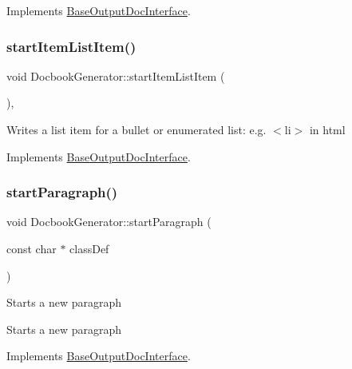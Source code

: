 Implements \mbox{\hyperlink{class_base_output_doc_interface_a54b169393594b6cf113977ccccaeb9ee}{Base\+Output\+Doc\+Interface}}.

\mbox{\label{class_docbook_generator_a2ee84d2ec43dc1634a71ee3101eab3e4}} 
\subsubsection{\texorpdfstring{startItemListItem()}{startItemListItem()}}
{\footnotesize\ttfamily void Docbook\+Generator\+::start\+Item\+List\+Item (\begin{DoxyParamCaption}{ }\end{DoxyParamCaption})\hspace{0.3cm}{\ttfamily [inline]}, {\ttfamily [virtual]}}

Writes a list item for a bullet or enumerated list\+: e.\+g. {\ttfamily $<$li$>$} in html 

Implements \mbox{\hyperlink{class_base_output_doc_interface_aa1cbcadfedf8e6d52029d17526b5fa3f}{Base\+Output\+Doc\+Interface}}.

\mbox{\label{class_docbook_generator_aa9920dace623a31301f5c7b9f5f739b8}} 
\subsubsection{\texorpdfstring{startParagraph()}{startParagraph()}}
{\footnotesize\ttfamily void Docbook\+Generator\+::start\+Paragraph (\begin{DoxyParamCaption}\item[{const char $\ast$}]{class\+Def }\end{DoxyParamCaption})\hspace{0.3cm}{\ttfamily [virtual]}}

Starts a new paragraph

Starts a new paragraph 

Implements \mbox{\hyperlink{class_base_output_doc_interface_a9f711f4ef8f48b9c7b1cae625578e7ff}{Base\+Output\+Doc\+Interface}}.

\mbox{\label{class_docbook_generator_a220738e28a4e2939e4da767f0ad33886}} 
